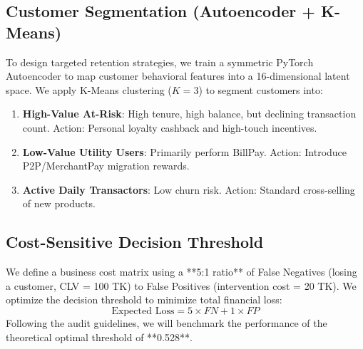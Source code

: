 \documentclass[11pt,a4paper]{article}
\begin{document}
\subsection{Customer Segmentation (Autoencoder + K-Means)}
To design targeted retention strategies, we train a symmetric PyTorch Autoencoder to map customer behavioral features into a 16-dimensional latent space. We apply K-Means clustering ($K=3$) to segment customers into:
\begin{enumerate}
    \item \textbf{High-Value At-Risk}: High tenure, high balance, but declining transaction count. Action: Personal loyalty cashback and high-touch incentives.
    \item \textbf{Low-Value Utility Users}: Primarily perform BillPay. Action: Introduce P2P/MerchantPay migration rewards.
    \item \textbf{Active Daily Transactors}: Low churn risk. Action: Standard cross-selling of new products.
\end{enumerate}

\subsection{Cost-Sensitive Decision Threshold}
We define a business cost matrix using a **5:1 ratio** of False Negatives (losing a customer, CLV = 100 TK) to False Positives (intervention cost = 20 TK). We optimize the decision threshold to minimize total financial loss:
$$\text{Expected Loss} = 5 \times FN + 1 \times FP$$
Following the audit guidelines, we will benchmark the performance of the theoretical optimal threshold of **0.528**.
\end{document}
